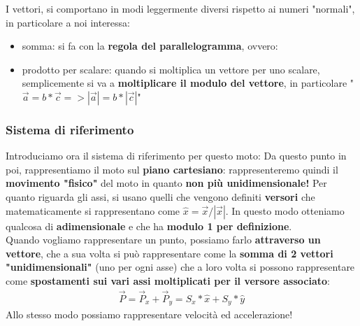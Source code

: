 				I vettori, si comportano in modi leggermente diversi rispetto ai numeri "normali", in particolare a noi interessa:
				\begin{itemize}
					\item somma: si fa con la \textbf{regola del parallelogramma}, ovvero:
					\item prodotto per scalare: quando si moltiplica un vettore per uno scalare, semplicemente si va a \textbf{moltiplicare il modulo del vettore}, in particolare "$\vec{a} = b * \vec{c} => |\vec{a}|= b * |\vec{c}|$"
				\end{itemize}

			\subsubsection{Sistema di riferimento}
				Introduciamo ora il sistema di riferimento per questo moto:
				Da questo punto in poi, rappresentiamo il moto sul \textbf{piano cartesiano}: rappresenteremo quindi il \textbf{movimento "fisico"} del moto in quanto \textbf{non più unidimensionale!} Per quanto riguarda gli assi, si usano quelli che vengono definiti \textbf{versori} che matematicamente si rappresentano come $\hat{x} = \vec{x}/|\vec{x}|$. In questo modo otteniamo qualcosa di \textbf{adimensionale} e che ha \textbf{modulo 1 per definizione}.
				\medskip\\
				Quando vogliamo rappresentare un punto, possiamo farlo \textbf{attraverso un vettore}, che a sua volta si può rappresentare come la \textbf{somma di 2 vettori "unidimensionali"} (uno per ogni asse) che a loro volta si possono rappresentare come \textbf{spostamenti sui vari assi moltiplicati per il versore associato}:
				\begin{align*}
					\vec{P} = \vec{P}_x + \vec{P}_y = S_x * \hat{x} + S_y * \hat{y}
				\end{align*}
				Allo stesso modo possiamo rappresentare velocità ed accelerazione!
